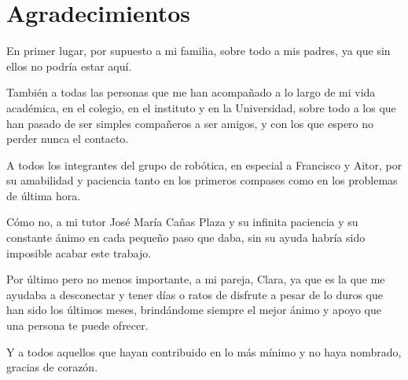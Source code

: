 \chapter*{Agradecimientos}

En primer lugar, por supuesto a mi familia, sobre todo a mis padres, ya que sin ellos no podría estar aquí. 

También a todas las personas que me han acompañado a lo largo de mi vida académica, en el colegio, en el instituto y en  la  Universidad, sobre todo a los que han pasado de ser  simples compañeros a ser amigos, y con los que espero no perder nunca el contacto.

A todos los integrantes del grupo de robótica, en especial a Francisco y Aitor, por su amabilidad y paciencia tanto en los primeros compases como en los problemas de última hora.

Cómo no, a mi tutor José María Cañas Plaza y su infinita paciencia y su constante ánimo en cada pequeño paso que daba, sin su ayuda habría sido imposible acabar este trabajo.

Por último pero no menos importante, a mi pareja, Clara, ya que es la que me ayudaba a desconectar y tener días o ratos de disfrute a pesar de lo duros que han sido los últimos meses, brindándome siempre el mejor ánimo y apoyo que una persona te puede ofrecer.

Y a todos aquellos que hayan contribuido en lo más mínimo y no haya nombrado, gracias de corazón.